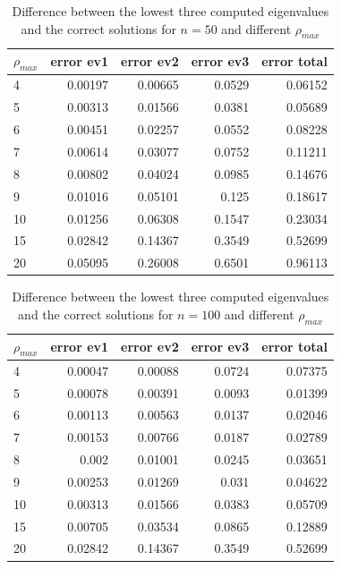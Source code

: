 \documentclass[11pt,a4wide]{article}
\begin{document}
\begin{table}%
\centering
\caption{Difference between the lowest three computed eigenvalues and the correct solutions for $n=50$ and different $\rho_{max}$}
\begin{tabular}{lrrrr}\hline
$\rho_{max}$ & error ev1 & error ev2 & error ev3 & error total\\\hline
4	& 0.00197	& 0.00665	& 0.0529 & 0.06152\\
5	& 0.00313	& 0.01566	& 0.0381 & 0.05689\\
6	& 0.00451	& 0.02257	& 0.0552 & 0.08228\\
7	& 0.00614	& 0.03077	& 0.0752 & 0.11211\\
8	& 0.00802	& 0.04024	& 0.0985 & 0.14676\\
9	& 0.01016	& 0.05101	& 0.125	 & 0.18617\\
10 & 0.01256	& 0.06308	& 0.1547 & 0.23034\\
15 & 0.02842	& 0.14367	& 0.3549 & 0.52699\\
20 & 0.05095	& 0.26008	& 0.6501 & 0.96113\\\hline
\end{tabular}
\label{tab:n=50 dif. rho_max}
\end{table}

\begin{table}%
\centering
\caption{Difference between the lowest three computed eigenvalues and the correct solutions for $n=100$ and different $\rho_{max}$}
\begin{tabular}{lrrrr}\hline
$\rho_{max}$ & error ev1 & error ev2 & error ev3 & error total\\\hline
4 & 0.00047 & 0.00088 & 0.0724 & 0.07375\\
5 & 0.00078 & 0.00391 & 0.0093 & 0.01399\\
6 & 0.00113 & 0.00563 & 0.0137 & 0.02046\\
7 & 0.00153 & 0.00766 & 0.0187 & 0.02789\\
8 & 0.002   & 0.01001 & 0.0245 & 0.03651\\
9 & 0.00253 & 0.01269 & 0.031  & 0.04622\\
10 & 0.00313 & 0.01566 & 0.0383 & 0.05709\\ 
15 & 0.00705 & 0.03534 & 0.0865 & 0.12889\\
20 & 0.02842 & 0.14367 & 0.3549 & 0.52699\\\hline
\end{tabular}
\label{tab:n=100 dif. rho_max}
\end{table}
\end{document}
